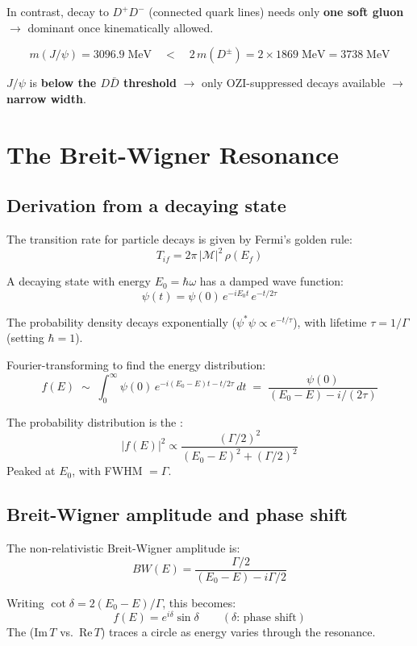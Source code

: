 In contrast, decay to $D^+D^-$ (connected quark lines) needs only \textbf{one soft gluon}
$\to$ dominant once kinematically allowed.

\[
  m(J/\psi) = 3096.9\;\mathrm{MeV}
  \quad < \quad
  2\,m(D^\pm) = 2 \times 1869\;\mathrm{MeV} = 3738\;\mathrm{MeV}
\]

$J/\psi$ is \textbf{below the $D\bar{D}$ threshold} $\to$ only OZI-suppressed decays
available $\to$ \textbf{narrow width}.

\section{The Breit-Wigner Resonance}

\subsection{Derivation from a decaying state}

The transition rate for particle decays is given by Fermi's golden rule:
\[
  T_{if} = 2\pi\,|\mathcal{M}|^2\,\rho(E_f)
\]

A decaying state with energy $E_0 = \hbar\omega$ has a damped wave function:
\[
  \psi(t) = \psi(0)\,e^{-iE_0 t}\,e^{-t/2\tau}
\]

The probability density decays exponentially ($\psi^*\psi \propto e^{-t/\tau}$), with
lifetime $\tau = 1/\Gamma$ (setting $\hbar = 1$).

Fourier-transforming to find the energy distribution:
\[
  f(E) \;\sim\; \int_0^\infty \psi(0)\,e^{-i(E_0 - E)t - t/2\tau}\,dt
  \;=\; \frac{\psi(0)}{(E_0 - E) - i/(2\tau)}
\]

The probability distribution is the :
\[
  |f(E)|^2 \propto \frac{(\Gamma/2)^2}{(E_0 - E)^2 + (\Gamma/2)^2}
\]
Peaked at $E_0$, with FWHM $= \Gamma$.

\subsection{Breit-Wigner amplitude and phase shift}

The non-relativistic Breit-Wigner amplitude is:
\[
  BW(E) = \frac{\Gamma/2}{(E_0 - E) - i\Gamma/2}
\]

Writing $\cot\delta = 2(E_0 - E)/\Gamma$, this becomes:
\[
  f(E) = e^{i\delta}\sin\delta \qquad (\delta\text{: phase shift})
\]
The  ($\mathrm{Im}\,T$ vs.\ $\mathrm{Re}\,T$) traces a circle as
energy varies through the resonance.

